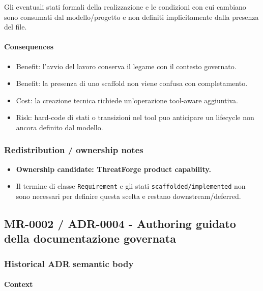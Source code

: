 \documentclass[
  10pt,
]{article}
\providecommand{\tightlist}{%
  \setlength{\itemsep}{0pt}\setlength{\parskip}{0pt}}
\begin{document}
Gli eventuali stati formali della realizzazione e le condizioni con cui
cambiano sono consumati dal modello/progetto e non definiti
implicitamente dalla presenza del file.

\paragraph{Consequences}\label{consequences-23}

\begin{itemize}
\tightlist
\item
  Benefit: l'avvio del lavoro conserva il legame con il contesto
  governato.
\item
  Benefit: la presenza di uno scaffold non viene confusa con
  completamento.
\item
  Cost: la creazione tecnica richiede un'operazione tool-aware
  aggiuntiva.
\item
  Risk: hard-code di stati o transizioni nel tool puo anticipare un
  lifecycle non ancora definito dal modello.
\end{itemize}

\subsubsection{Redistribution / ownership
notes}\label{redistribution-ownership-notes-11}

\begin{itemize}
\tightlist
\item
  \textbf{Ownership candidate: ThreatForge product capability.}
\item
  Il termine di classe \texttt{Requirement} e gli stati
  \texttt{scaffolded/implemented} non sono necessari per definire questa
  scelta e restano downstream/deferred.
\end{itemize}

\subsection{MR-0002 / ADR-0004 - Authoring guidato della documentazione
governata}\label{mr-0002-adr-0004---authoring-guidato-della-documentazione-governata}

\subsubsection{Historical ADR semantic
body}\label{historical-adr-semantic-body-12}

\paragraph{Context}\label{context-24}
\end{document}
